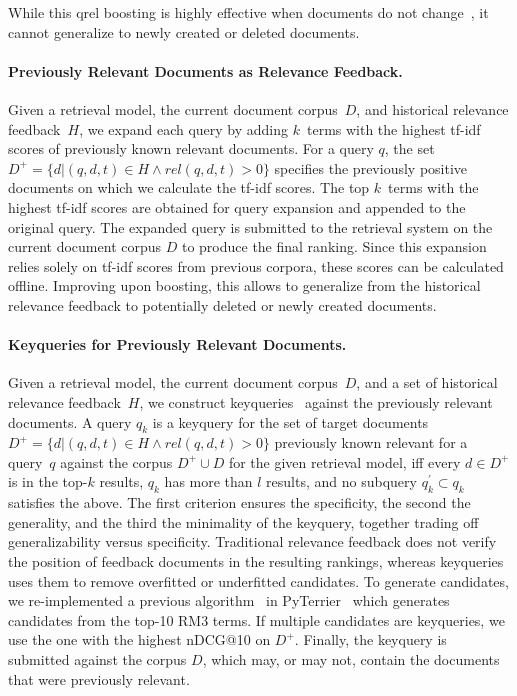     
While this qrel boosting is highly effective when documents do not change~\cite{alkhalifa:2024,keller:2024b}, it cannot generalize to newly created or deleted documents.

\paragraph{Previously Relevant Documents as Relevance Feedback.} Given a retrieval model, the current document corpus~$D$, and historical relevance feedback~$H$, we expand each query by adding $k$~terms with the highest tf-idf scores of previously known relevant documents. For a query $q$, the set $D^{+} = \{d| (q,d,t) \in H \wedge rel(q,d,t) > 0\}$ specifies the previously positive documents on which we calculate the tf-idf scores. The top $k$~terms with the highest tf-idf scores are obtained for query expansion and appended to the original query. The expanded query is submitted to the retrieval system on the current document corpus $D$ to produce the final ranking. Since this expansion relies solely on tf-idf scores from previous corpora, these scores can be calculated offline. Improving upon boosting, this allows to generalize from the historical relevance feedback to potentially deleted or newly created documents.


\paragraph{Keyqueries for Previously Relevant Documents.} Given a retrieval model, the current document corpus~$D$, and a set of historical relevance feedback~$H$, we construct keyqueries~\cite{froebe:2021c,gollub:2013a,hagen:2016b} against the previously relevant documents. A query $q_{k}$ is a keyquery for the set of target documents $D^{+} = \{d| (q,d,t) \in H \wedge rel(q,d,t) > 0\}$ previously known relevant for a query~$q$ against the corpus $D^{+} \cup D$ for the given retrieval model, iff \Ni every $d \in D^{+}$ is in the top-$k$ results, \Nii $q_{k}$ has more than $l$ results, and \Niii no subquery $q^{'}_{k} \subset q_{k}$ satisfies the above. The first criterion ensures the specificity, the second the generality, and the third the minimality of the keyquery, together trading off generalizability versus specificity. Traditional relevance feedback does not verify the position of feedback documents in the resulting rankings, whereas keyqueries uses them to remove overfitted or underfitted candidates. To generate candidates, we re-implemented a previous algorithm~\cite{froebe:2022c} in PyTerrier~\cite{macdonald:2020} which generates candidates from the top-10 RM3 terms. If multiple candidates are keyqueries, we use the one with the highest nDCG@10 on $D^{+}$. Finally, the keyquery is submitted against the corpus $D$, which may, or may not, contain the documents that were previously relevant.

